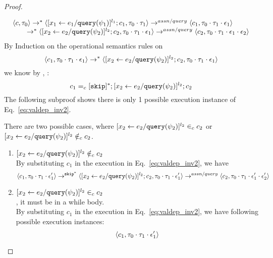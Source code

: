 \begin{proof}
\begin{case}[$\trace_2 = \cdot$]
\[
  \begin{array}{l}   
\langle {c}, \mathtt{\tau}_0 \rangle \rightarrow^{*} 
\langle [\mathrel{ {x}_1 \leftarrow e_1 / {\tt query}(\psi_1) }]^{l_1} ; {c}_1, \mathtt{\tau}_0 \cdot \mathtt{\tau}_1 \rangle  \rightarrow^{assn/query}
 \langle c_1, \mathtt{\tau}_0 \cdot \mathtt{\tau}_1 \cdot \mathtt{\epsilon}_1 \rangle \\
  \qquad \rightarrow^{*} 
  \langle [\mathrel{ {x}_2 \leftarrow e_2 / {\tt query}(\psi_2) }]^{l_2};{c}_2, 
  \mathtt{\tau}_0 \cdot \mathtt{\tau}_1 \cdot \mathtt{\epsilon}_1 \rangle 
  \rightarrow^{assn/query} 
  \langle {c}_2,  \mathtt{\tau}_0 \cdot \mathtt{\tau}_1 \cdot \mathtt{\epsilon}_1 \cdot \mathtt{\epsilon}_2 \rangle 
\end{array}
 \]
 By Induction on the operational semantics rules on 
 \[\langle c_1, \mathtt{\tau}_0 \cdot \mathtt{\tau}_1 \cdot \mathtt{\epsilon}_1 \rangle
  \rightarrow^{*} 
  \langle [\mathrel{ {x}_2 \leftarrow e_2 / {\tt query}(\psi_2) }]^{l_2};{c}_2, 
  \mathtt{\tau}_0 \cdot \mathtt{\tau}_1 \cdot \mathtt{\epsilon}_1 \rangle \]
 we know by  , :
 \[
 c_1 =_c 
 [\mathtt{skip}]{}^*;[\mathrel{ {x}_2 \leftarrow e_2 / {\tt query}(\psi_2) }]^{l_2};{c}_2
 \]
The following subproof shows there is only 1 possible execution instance of Eq.~\ref{eq:valdep_inv2}.
\begin{subproof}[Subproof]
\label{pf:noiteration_inv2}
There are two possible cases, 
where $[\mathrel{ {x}_2 \leftarrow e_2 / {\tt query}(\psi_2) }]^{l_2} \in_c c_2$ 
or $[\mathrel{ {x}_2 \leftarrow e_2 / {\tt query}(\psi_2) }]^{l_2} \notin_c c_2$.
%
\begin{enumerate}
\item{$[\mathrel{ {x}_2 \leftarrow e_2 / {\tt query}(\psi_2) }]^{l_2}\notin_c c_2$}
\\
By substituting $c_1$ in the execution in Eq.~\ref{eq:valdep_inv2}, we have 
  \[
  \langle c_1, \mathtt{\tau}_0 \cdot \mathtt{\tau}_1 \cdot \mathtt{\epsilon}_1' \rangle 
  \rightarrow^{\mathtt{skip}^*} 
  \langle [\mathrel{ {x}_2 \leftarrow e_2 / {\tt query}(\psi_2) }]^{l_2} ; {c}_2, \mathtt{\tau}_0 \cdot \mathtt{\tau}_1 \cdot \mathtt{\epsilon}_1' \rangle 
  \rightarrow^{assn/query} 
  \langle {c}_2,  \mathtt{\tau}_0 \cdot \mathtt{\tau}_1 \cdot \mathtt{\epsilon}_1' \cdot \mathtt{\epsilon}_2' \rangle 
 \]
%
\item{$[\mathrel{ {x}_2 \leftarrow e_2 / {\tt query}(\psi_2) }]^{l_2} \in_c c_2$}
\\
, it must be in a while body.
\\
 By substituting $c_1$ in the execution in Eq.~\ref{eq:valdep_inv2}, we have following possible execution instances:
  \[
  \langle c_1, \mathtt{\tau}_0 \cdot \mathtt{\tau}_1 \cdot \mathtt{\epsilon}_1' \rangle 
\]
\end{enumerate}
\end{subproof}
\end{case}
\end{proof}
